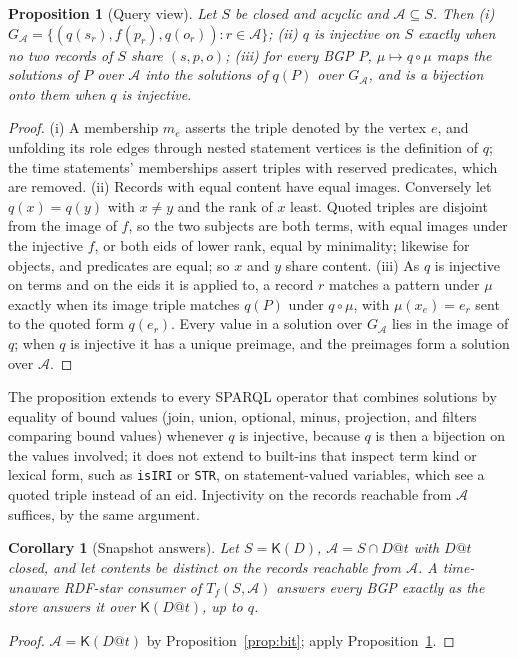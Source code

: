 \documentclass[11pt]{article}
\theoremstyle{plain}
\newtheorem{proposition}[theorem]{Proposition}
\newtheorem{corollary}[theorem]{Corollary}
\theoremstyle{definition}
\theoremstyle{remark}
\newcommand{\Kernel}{\mathsf{K}}
\begin{document}
\begin{proposition}[Query view]\label{prop:queries}
Let $S$ be closed and acyclic and $\mathcal A\subseteq S$. Then
(i) $G_{\mathcal A}=\{(q(s_r),f(p_r),q(o_r)):r\in\mathcal A\}$;
(ii) $q$ is injective on $S$ exactly when no two records of $S$ share $(s,p,o)$;
(iii) for every BGP $P$, $\mu\mapsto q\circ\mu$ maps the solutions of $P$ over
$\mathcal A$ into the solutions of $q(P)$ over $G_{\mathcal A}$, and is a bijection
onto them when $q$ is injective.
\end{proposition}
\begin{proof}
(i) A membership $m_e$ asserts the triple denoted by the vertex $e$, and unfolding
its role edges through nested statement vertices is the definition of $q$; the time
statements' memberships assert triples with reserved predicates, which are removed.
(ii) Records with equal content have equal images. Conversely let $q(x)=q(y)$ with
$x\neq y$ and the rank of $x$ least. Quoted triples are disjoint from the image of
$f$, so the two subjects are both terms, with equal images under the injective $f$,
or both eids of lower rank, equal by minimality; likewise for objects, and
predicates are equal; so $x$ and $y$ share content.
(iii) As $q$ is injective on terms and on the eids it is applied to, a record $r$
matches a pattern under $\mu$ exactly when its image triple matches $q(P)$ under
$q\circ\mu$, with $\mu(x_e)=e_r$ sent to the quoted form $q(e_r)$. Every value in a
solution over $G_{\mathcal A}$ lies in the image of $q$; when $q$ is injective it has
a unique preimage, and the preimages form a solution over $\mathcal A$.
\end{proof}

The proposition extends to every SPARQL operator that combines solutions by
equality of bound values (join, union, optional, minus, projection, and filters
comparing bound values) whenever $q$ is injective, because $q$ is then a bijection
on the values involved; it does not extend to
built-ins that inspect term kind or lexical form, such as \texttt{isIRI} or
\texttt{STR}, on statement-valued variables, which see a quoted triple instead of an
eid. Injectivity on the records reachable from $\mathcal A$ suffices, by the same
argument.

\begin{corollary}[Snapshot answers]\label{cor:snapshot-queries}
Let $S=\Kernel(D)$, $\mathcal A=S\cap D@t$ with $D@t$ closed, and let contents be
distinct on the records reachable from $\mathcal A$. A time-unaware RDF-star consumer
of $T_f(S,\mathcal A)$ answers every BGP exactly as the store answers it over
$\Kernel(D@t)$, up to $q$.
\end{corollary}
\begin{proof}
$\mathcal A=\Kernel(D@t)$ by Proposition~\ref{prop:bit}; apply
Proposition~\ref{prop:queries}.
\end{proof}
\end{document}
